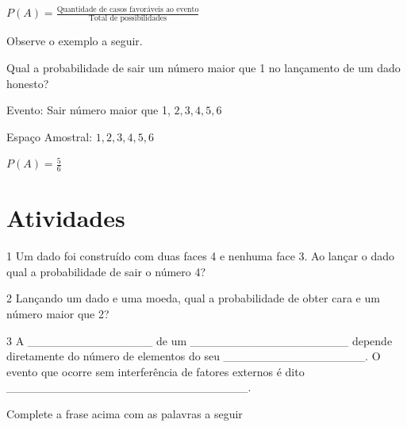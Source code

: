 \begin{escolha}
\begin{escolha}
\begin{escolha}
\begin{escolha}
{\begin{boxmedio}
\begin{boxpeq}
\begin{q°}
\begin{boxmedio}
\begin{boxpeq}
\begin{boxpeq}
\begin{boxmedio}
\begin{boxmedio}
\begin{boxmedio}
\begin{largebox}
\begin{boxmedio}
{\begin{enumerate}
\begin{boxpeq}
{\begin{boxpeq}
\begin{boxpeq}
\begin{boxmedio}
\begin{boxpeq}
\begin{boxpeq}
\begin{boxpeq}
{\begin{boxpeq}
\begin{boxmedio}
\begin{boxpeq}
{$P(A)=\frac{\text{Quantidade de casos favoráveis ao evento}}{\text{Total de possibilidades}}$

Observe o exemplo a seguir.

Qual a probabilidade de sair um número maior que 1 no lançamento de um dado honesto?

Evento: Sair número maior que 1, ${2, 3, 4, 5, 6}$

Espaço Amostral: ${1, 2, 3, 4, 5, 6}$

$P(A) = \frac{5}{6}$
}

\section{Atividades}

\num{1} Um dado foi construído com duas faces 4 e nenhuma face 3. Ao lançar o
dado qual a probabilidade de sair o número 4?

\begin{boxpeq}

\num{2} Lançando um dado e uma moeda, qual a probabilidade de obter cara e um
número maior que 2?

\begin{boxpeq}

\num{3} A \_\_\_\_\_\_\_\_\_\_\_\_\_\_\_ de um
\_\_\_\_\_\_\_\_\_\_\_\_\_\_\_\_\_\_\_ depende diretamente do número de
elementos do seu \_\_\_\_\_\_\_\_\_\_\_\_\_\_\_\_\_. O evento que ocorre
sem interferência de fatores externos é dito
\_\_\_\_\_\_\_\_\_\_\_\_\_\_\_\_\_\_\_\_\_\_\_\_\_\_\_\_\_.

Complete a frase acima com as palavras a seguir


\end{boxpeq}
\end{boxpeq}
\end{boxpeq}
\end{boxmedio}
\end{boxpeq}}
\end{boxpeq}
\end{boxpeq}
\end{boxpeq}
\end{boxmedio}
\end{boxpeq}
\end{boxpeq}}
\end{boxpeq}
\end{enumerate}}
\end{boxmedio}
\end{largebox}
\end{boxmedio}
\end{boxmedio}
\end{boxmedio}
\end{boxpeq}
\end{boxpeq}
\end{boxmedio}
\end{q°}
\end{boxpeq}
\end{boxmedio}}
\end{escolha}
\end{escolha}
\end{escolha}
\end{escolha}
